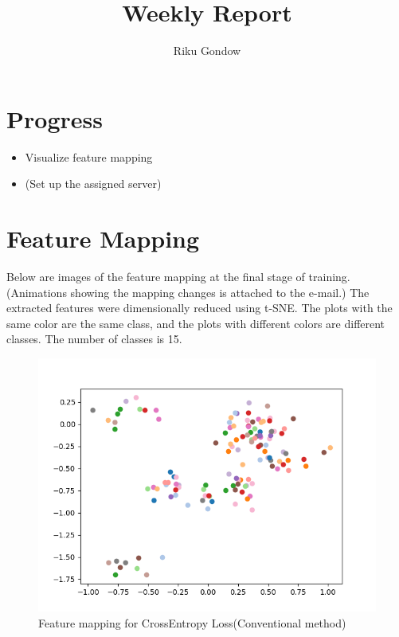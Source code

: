 \documentclass[dvipdfmx]{article}
\begin{document}
\title{Weekly Report}
\author{Riku Gondow}
\maketitle
\section{Progress}
\begin{itemize}
    \item Visualize feature mapping
    \item (Set up the assigned server)
\end{itemize}

\section{Feature Mapping}
Below are images of the feature mapping at the final stage of training. (Animations showing the mapping changes is attached to the e-mail.)
The extracted features were dimensionally reduced using t-SNE. The plots with the same color are the same class, and the plots with different colors are different classes. The number of classes is 15.


\begin{figure}[H]
\begin{center}
\includegraphics[width=0.8\linewidth]{./img/Cross_300_01_Fmap.png}
\end{center}
\caption{Feature mapping for CrossEntropy Loss(Conventional method)}
\end{figure}
\end{document}
